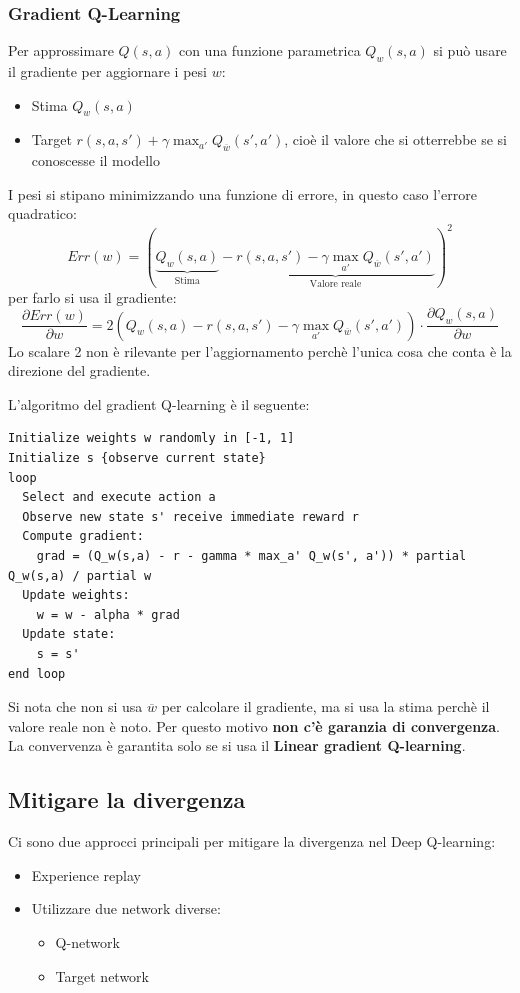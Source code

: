 \documentclass[a4paper]{article}
\begin{document}
\subsubsection{Gradient Q-Learning}
Per approssimare \( Q(s,a) \) con una funzione parametrica \( Q_w(s,a) \) si può
usare il gradiente per aggiornare i pesi \( w \):
\begin{itemize}
  \item Stima \( Q_w(s,a) \) 
  \item Target \( r(s,a,s') + \gamma \max_{a'} Q_{\overline{w}}(s', a') \), cioè il valore
    che si otterrebbe se si conoscesse il modello
\end{itemize}
I pesi si stipano minimizzando una funzione di errore, in questo caso l'errore quadratico:
\[
  Err(w) = \left( \underbrace{Q_w(s,a)}_{\text{Stima}}
  - 
  \underbrace{r(s,a,s') - \gamma \max_{a'} Q_{\overline{w}}(s', a')}_{\text{Valore reale}} \right)^2
\] 
per farlo si usa il gradiente:
\[
  \frac{\partial Err(w)}{\partial w} = 2 \left( Q_w(s,a) - r(s,a,s') - \gamma \max_{a'} Q_{\overline{w}}(s', a') \right)
  \cdot \frac{\partial Q_w(s,a)}{\partial w}
\] 
Lo scalare 2 non è rilevante per l'aggiornamento perchè l'unica cosa che conta è la direzione
del gradiente.

\vspace{1em}
\noindent
L'algoritmo del gradient Q-learning è il seguente:
\begin{lstlisting}
Initialize weights w randomly in [-1, 1]
Initialize s {observe current state}
loop
  Select and execute action a
  Observe new state s' receive immediate reward r
  Compute gradient:
    grad = (Q_w(s,a) - r - gamma * max_a' Q_w(s', a')) * partial Q_w(s,a) / partial w
  Update weights:
    w = w - alpha * grad
  Update state:
    s = s'
end loop
\end{lstlisting}
Si nota che non si usa \( \overline{w} \) per calcolare il gradiente, ma si usa la stima
perchè il valore reale non è noto. Per questo motivo \textbf{non c'è garanzia di convergenza}.
La convervenza è garantita solo se si usa il \textbf{Linear gradient Q-learning}.


\subsection{Mitigare la divergenza}
Ci sono due approcci principali per mitigare la divergenza nel Deep Q-learning:
\begin{itemize}
  \item Experience replay
  \item Utilizzare due network diverse:
    \begin{itemize}
      \item Q-network
      \item Target network
    \end{itemize}
\end{itemize}
\end{document}
